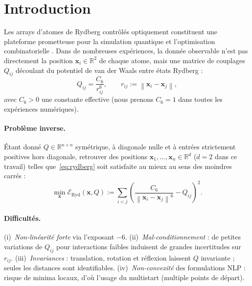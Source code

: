 \documentclass[11pt,a4paper]{article}
\theoremstyle{definition}
\theoremstyle{remark}
\newcommand{\R}{\mathbb{R}}
\newcommand{\norm}[1]{\left\|#1\right\|}
\newcommand{\Eryd}{\mathcal{E}_{\mathrm{Ryd}}}
\newcommand{\cSix}{C_6}
\begin{document}
\section{Introduction}
\label{sec:intro}

Les arrays d'atomes de Rydberg contrôlés optiquement constituent une plateforme
prometteuse pour la simulation quantique et l'optimisation combinatorielle
\cite{bernien2017,henry2024}. Dans de nombreuses expériences, la donnée
observable n'est pas directement la position $\mathbf{x}_i \in \R^2$ de
chaque atome, mais une matrice de couplages $Q_{ij}$ découlant du potentiel
de van der Waals entre états Rydberg :
\begin{equation}
  Q_{ij} = \frac{\cSix}{r_{ij}^6}, \qquad
  r_{ij} := \norm{\mathbf{x}_i - \mathbf{x}_j},
  \label{eq:rydberg}
\end{equation}
avec $\cSix > 0$ une constante effective (nous prenons $\cSix = 1$ dans
toutes les expériences numériques).

\paragraph{Problème inverse.}
Étant donné $Q \in \R^{n \times n}$ symétrique, à diagonale nulle et à
entrées strictement positives hors diagonale, retrouver des positions
$\mathbf{x}_1,\ldots,\mathbf{x}_n \in \R^d$ ($d=2$ dans ce travail) telles
que~\eqref{eq:rydberg} soit satisfaite au mieux au sens des moindres carrés :
\begin{equation}
  \min_{\mathbf{x}}
  \Eryd(\mathbf{x}, Q)
  :=
  \sum_{i<j}
  \left(
    \frac{\cSix}{\norm{\mathbf{x}_i-\mathbf{x}_j}^6}
    - Q_{ij}
  \right)^2.
  \label{eq:objectif}
\end{equation}

\paragraph{Difficultés.}
(i)~\emph{Non-linéarité forte} via l'exposant $-6$.
(ii)~\emph{Mal-conditionnement} : de petites variations de $Q_{ij}$ pour
interactions faibles induisent de grandes incertitudes sur $r_{ij}$.
(iii)~\emph{Invariances} : translation, rotation et réflexion laissent $Q$
invariante ; seules les distances sont identifiables.
(iv)~\emph{Non-convexité} des formulations NLP : risque de minima locaux,
d'où l'usage du multistart (multiple points de départ).
\end{document}
